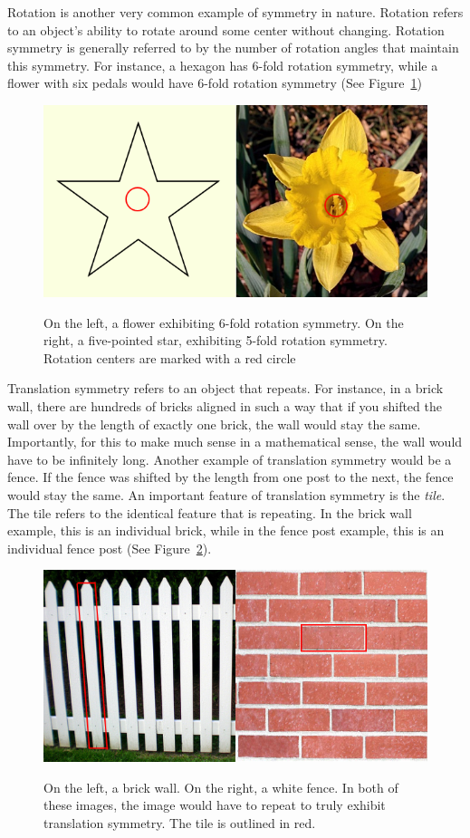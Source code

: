 Rotation is another very common example of symmetry in nature. Rotation refers to an object's ability to rotate around some center without changing. Rotation symmetry is generally referred to by the number of rotation angles that maintain this symmetry. For instance, a hexagon has 6-fold rotation symmetry, while a flower with six pedals would have 6-fold rotation symmetry (See Figure~\ref{rot})

\begin{figure}
\centering
\includegraphics[width=0.9\columnwidth]{rotation}
\label{rot}
\caption{On the left, a flower exhibiting 6-fold rotation symmetry. On the right, a five-pointed star, exhibiting 5-fold rotation symmetry. Rotation centers are marked with a red circle}
\end{figure}

Translation symmetry refers to an object that repeats. For instance, in a brick wall, there are hundreds of bricks aligned in such a way that if you shifted the wall over by the length of exactly one brick, the wall would stay the same. Importantly, for this to make much sense in a mathematical sense, the wall would have to be infinitely long. Another example of translation symmetry would be a fence. If the fence was shifted by the length from one post to the next, the fence would stay the same. An important feature of translation symmetry is the \textit{tile}. The tile refers to the identical feature that is repeating. In the brick wall example, this is an individual brick, while in the fence post example, this is an individual fence post (See Figure~\ref{trans}).

\begin{figure}
\centering
\includegraphics[width=0.9\columnwidth]{translation}
\label{trans}
\caption{On the left, a brick wall. On the right, a white fence. In both of these images, the image would have to repeat to truly exhibit translation symmetry. The tile is outlined in red.}
\end{figure}

